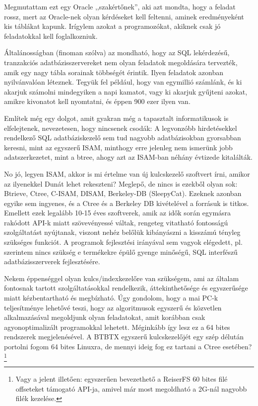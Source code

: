 Megmutattam ezt egy Oracle ,,szakértőnek'', aki azt mondta,
hogy a feladat rossz, mert az Oracle-nek olyan kérdéseket kell
feltenni, aminek eredményeként kis táblákat kapunk. Irígylem azokat
a programozókat, akiknek csak jó feladatokkal kell foglalkozniuk.

Általánosságban (finoman szólva) az mondható, hogy 
az SQL lekérdezésű, tranzakciós adatbázisszervereket nem olyan feladatok 
megoldására tervezték, amik egy nagy tábla sorainak többségét érintik. 
Ilyen feladatok azonban nyilvánvalóan léteznek. Tegyük fel például, hogy 
van egymillió számlánk, és ki akarjuk számolni mindegyiken a napi kamatot, 
vagy ki akarjuk gyűjteni azokat, amikre kivonatot kell nyomtatni, 
és éppen 900 ezer ilyen van.

Említek még egy dolgot, amit gyakran még a tapasztalt informatikusok
is elfelejtenek, nevezetesen, hogy nincsenek csodák: A legvonzóbb
hirdetésekkel rendelkező SQL adatbáziskezelő sem tud nagyobb adatbázisokban
gyorsabban keresni, mint az egyszerű ISAM, minthogy erre jelenleg nem 
ismerünk jobb adatszerkezetet, mint a btree, 
ahogy azt az ISAM-ban néhány évtizede kitalálták.

No jó, legyen ISAM, akkor is mi értelme van  új kulcskezelő
szoftvert írni, amikor az ilyenekkel Dunát lehet rekeszteni?
Meglepő, de nincs is ezekből olyan sok: Btrieve, Ctree, C-ISAM,
DISAM, Berkeley-DB (SleepyCat). Ezeknek azonban egyike sem ingyenes,
és a Ctree és a Berkeley DB kivételével a forrásuk is titkos. 
Emellett ezek legalább
10-15 éves szoftverek, amik az idők során egymásra rakódott API-k
miatt szövevényessé váltak, rengeteg vitatható fontosságú szolgáltatást
nyújtanak, viszont nehéz belőlük kibányászni a kisszámú tényleg 
szükséges funkciót. A programok fejlesztési irányával sem vagyok
elégedett, pl.{} szerintem nincs szükség e termékekre épülő
gyenge minőségű, SQL interfészű adatbázisszerverek fejlesztésére.

Nekem éppenséggel olyan kulcs/indexkezelőre van szükségem,
ami az általam fontosnak tartott szolgáltatásokkal rendelkezik,
áttekinthetősége és egyszerűsége miatt kézbentartható és megbízható.
Úgy gondolom, hogy a mai PC-k teljesítménye lehetővé teszi, hogy
az algoritmusok egyszerű és közvetlen alkalmazásával megoldjunk
olyan feladatokat, amit korábban csak agyonoptimalizált programokkal
lehetett.  Méginkább így lesz ez a 64 bites rendszerek megjelenésével. 
A BTBTX egyszerű kulcskezelőjét egy szép délután portolni fogom 64 bites 
Linuxra, de mennyi ideig fog ez tartani a Ctree esetében?\footnote{
Vagy a jelent illetően: egyszerűen bevezethető a ReiserFS 
60 bites filé offseteket támogató API-ja, amivel már most
megoldható a 2G-nál nagyobb filék kezelése.}

